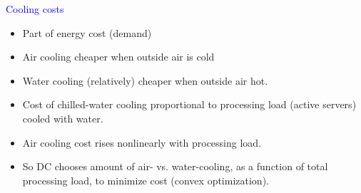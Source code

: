 \documentclass[xcolor=dvipsnames]{beamer}
\newcommand{\eqdef}{\ensuremath{\overset{\mathrm{def}}{=}}}
\begin{document}
\begin{frame}{\textcolor{blue}{Cooling costs}}

  




\begin{itemize}
	\item Part of energy cost (demand)
	\item Air cooling cheaper when outside air is cold
	\item Water cooling (relatively) cheaper when outside air hot.
	\item Cost of chilled-water cooling proportional to processing load (active servers) cooled with water.
	\item Air cooling cost rises nonlinearly with processing load.
	\item So DC chooses amount of air- vs. water-cooling, as a function of total processing load, to minimize cost (convex optimization).
\end{itemize}



\end{frame}
\end{document}
